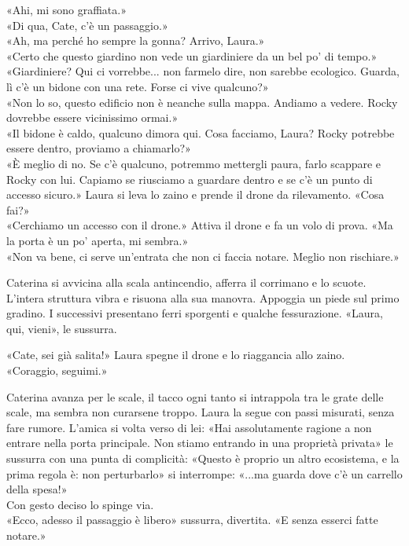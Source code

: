 \documentclass[10pt,oneside]{extbook}
\begin{document}
«Ahi, mi sono graffiata.»\\
«Di qua, Cate, c’\`e un passaggio.»\\
«Ah, ma perch\'e ho sempre la gonna? Arrivo, Laura.»\\
«Certo che questo giardino non vede un giardiniere da un bel po’ di tempo.»\\
«Giardiniere? Qui ci vorrebbe... non farmelo dire, non sarebbe ecologico. Guarda, l\`i c’\`e un bidone con una rete. Forse ci vive qualcuno?»\\
«Non lo so, questo edificio non \`e neanche sulla mappa. Andiamo a vedere. Rocky dovrebbe essere vicinissimo ormai.»\\
«Il bidone \`e caldo, qualcuno dimora qui. Cosa facciamo, Laura? Rocky potrebbe essere dentro, proviamo a chiamarlo?»\\
«\`E meglio di no. Se c’\`e qualcuno, potremmo mettergli paura, farlo scappare e Rocky con lui. Capiamo se riusciamo a guardare dentro e se c’\`e un punto di accesso sicuro.» Laura si leva lo zaino e prende il drone da rilevamento.
«Cosa fai?»\\
«Cerchiamo un accesso con il drone.» Attiva il drone e fa un volo di prova.
«Ma la porta \`e un po’ aperta, mi sembra.»\\
«Non va bene, ci serve un’entrata che non ci faccia notare. Meglio non rischiare.»

\par\medskip
Caterina si avvicina alla scala antincendio, afferra il corrimano e lo scuote. L'intera struttura vibra e risuona alla sua manovra. Appoggia un piede sul primo gradino. I successivi presentano ferri sporgenti e qualche fessurazione.
«Laura, qui, vieni», le sussurra.

\par\medskip
«Cate, sei gi\`a salita!» Laura spegne il drone e lo riaggancia allo zaino.\\
«Coraggio, seguimi.»

\par\medskip
Caterina avanza per le scale, il tacco ogni tanto si intrappola tra le grate delle scale, ma sembra non curarsene troppo. Laura la segue con passi misurati, senza fare rumore. L'amica si volta verso di lei:
«Hai assolutamente ragione a non entrare nella porta principale. Non stiamo entrando in una proprietà privata» le sussurra con una punta di complicità: «Questo \`e proprio un altro ecosistema, e la prima regola \`e: non perturbarlo» si interrompe: «...ma guarda dove  c’\`e un carrello della spesa!»\\
Con gesto deciso lo spinge via.\\
«Ecco, adesso il passaggio \`e libero» sussurra, divertita. «E senza esserci fatte notare.»
\end{document}
